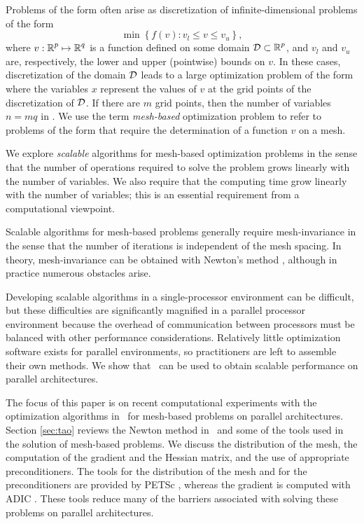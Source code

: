 Problems of the form  often
arise as discretization of
infinite-dimensional problems of the form
\begin{equation}
  \label{eq:opt-mesh}
  \min \left \{ f (v) : v_l \le v \le v_u \right \} ,
\end{equation}
where $ v : \mbox{${\mathbb R}$}^p \mapsto \mbox{${\mathbb R}$}^q $ is a function defined on
some domain $ \mbox{$\cal D$} \subset \mbox{${\mathbb R}$}^p $, and $ v_l $ and $ v_u $
are, respectively, the lower and upper (pointwise) bounds on
$v$.  In these cases, discretization of the domain $ \mbox{$\cal D$} $
leads to a large optimization problem of the form
 where the variables $ x $ represent the values
of $ v $ at the grid points of the discretization of $ \mbox{$\cal D$}
$.  If there are $m$ grid points, then the number
of variables $ n = mq $ in .  We use the term
\textit{mesh-based} optimization problem to refer to 
problems of the form  that require the
determination of a function $v$ on a mesh.

We explore \textit{scalable} algorithms for mesh-based optimization
problems in the sense that the number of operations required
to solve the problem grows linearly with the number of
variables.  We also require that the computing time grow
linearly with the number of variables; this is an essential
requirement from a computational viewpoint.

Scalable algorithms for mesh-based problems
generally require mesh-invariance in the sense that the
number of iterations is independent of the mesh spacing.  In
theory, mesh-invariance can be obtained with Newton's method
\cite{ALD00}, although in practice numerous
obstacles arise.  

Developing scalable algorithms in a single-processor
environment can be difficult, but these difficulties are
significantly magnified in a parallel processor
environment because the overhead of communication between
processors must be balanced with other performance
considerations.  Relatively little optimization software
exists for parallel environments, so practitioners are left
to assemble their own methods. We show that \tao\
can be used to obtain scalable performance on
parallel architectures.

The focus of this paper is on recent computational experiments
with the optimization algorithms in \tao\ for mesh-based
problems on parallel architectures.  Section
\ref{sec:tao} reviews the Newton method in \tao\ and some of
the tools used in the solution of mesh-based problems.  We
discuss the distribution of the mesh, the computation of the
gradient and the Hessian matrix, and the use of appropriate
preconditioners.  The tools for the distribution of the mesh
and for the preconditioners are provided by PETSc
\cite{PETSc-manual,petsc-home}, whereas the
gradient is computed with ADIC \cite{ADIC,adic-home}.
These tools reduce many of the
barriers associated with solving these problems on
parallel architectures.


